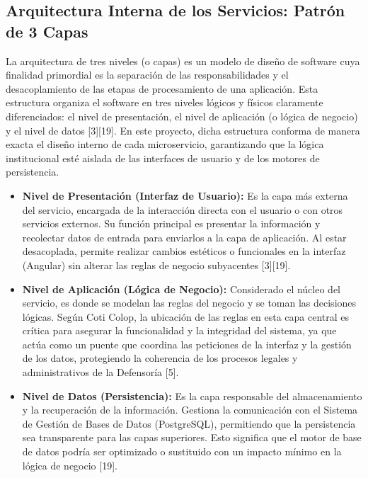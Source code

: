 \subsection{Arquitectura Interna de los Servicios: Patrón de 3 Capas}

La arquitectura de tres niveles (o capas) es un modelo de diseño de software cuya finalidad primordial es la separación de las responsabilidades y el desacoplamiento de las etapas de procesamiento de una aplicación. Esta estructura organiza el software en tres niveles lógicos y físicos claramente diferenciados: el nivel de presentación, el nivel de aplicación (o lógica de negocio) y el nivel de datos [3][19]. En este proyecto, dicha estructura conforma de manera exacta el diseño interno de cada microservicio, garantizando que la lógica institucional esté aislada de las interfaces de usuario y de los motores de persistencia.



\begin{itemize}
    \item \textbf{Nivel de Presentación (Interfaz de Usuario):} Es la capa más externa del servicio, encargada de la interacción directa con el usuario o con otros servicios externos. Su función principal es presentar la información y recolectar datos de entrada para enviarlos a la capa de aplicación. Al estar desacoplada, permite realizar cambios estéticos o funcionales en la interfaz (Angular) sin alterar las reglas de negocio subyacentes [3][19].
    
    \item \textbf{Nivel de Aplicación (Lógica de Negocio):} Considerado el núcleo del servicio, es donde se modelan las reglas del negocio y se toman las decisiones lógicas. Según Coti Colop, la ubicación de las reglas en esta capa central es crítica para asegurar la funcionalidad y la integridad del sistema, ya que actúa como un puente que coordina las peticiones de la interfaz y la gestión de los datos, protegiendo la coherencia de los procesos legales y administrativos de la Defensoría [5].
    
    \item \textbf{Nivel de Datos (Persistencia):} Es la capa responsable del almacenamiento y la recuperación de la información. Gestiona la comunicación con el Sistema de Gestión de Bases de Datos (PostgreSQL), permitiendo que la persistencia sea transparente para las capas superiores. Esto significa que el motor de base de datos podría ser optimizado o sustituido con un impacto mínimo en la lógica de negocio [19].
\end{itemize}

